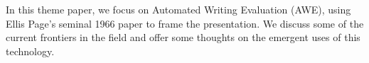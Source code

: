 In this theme paper, we focus on Automated Writing Evaluation (AWE), using Ellis Page's seminal 1966 paper to frame the presentation. We discuss some of the current frontiers in the field and offer some thoughts on the emergent uses of this technology.
